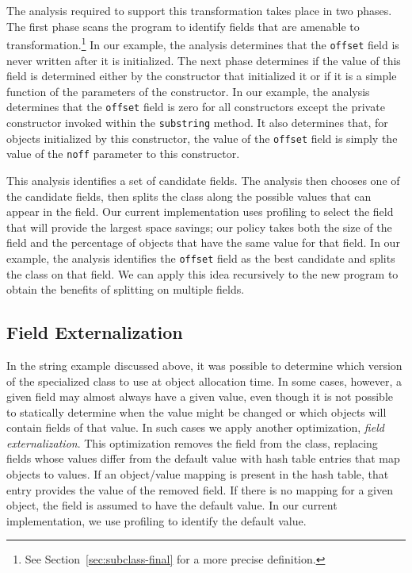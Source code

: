 \documentclass{acmconf}
\begin{document}
The analysis required to support this transformation takes place
in two phases. The first phase scans the program
to identify fields that
are amenable to transformation.\footnote{See
  Section~\ref{sec:subclass-final} for a more precise definition.}
In our example, the analysis
determines that the {\tt offset} field is never written after
it is initialized. The next phase determines if the value
of this field is determined either by the constructor that
initialized it or if it is a simple function of the parameters
of the constructor. In our example, the analysis determines
that the {\tt offset} field is zero for all constructors
except the private constructor invoked within the {\tt substring}
method. It also determines that, for objects initialized by 
this constructor, the value of the {\tt offset} field is simply
the value of the {\tt noff} parameter to this constructor. 

This analysis identifies a set of candidate fields. 
The analysis then chooses one of the candidate fields, then 
splits the class along the possible values
that can appear in the field. Our current implementation uses
profiling to select the field that will provide the largest
space savings; our policy takes both the size of the field
and the percentage of objects that have the same value for 
that field. In our example, the analysis identifies the 
{\tt offset} field as the best candidate and splits the class
on that field. We can apply this idea recursively to the 
new program to obtain the benefits of splitting on multiple
fields. 

\subsection{Field Externalization}

In the string example discussed above, it was possible to determine
which version of the specialized class to use at object allocation
time. In some cases, however, a given field may almost always have
a given value, even though it is not possible to statically determine
when the value might be changed or which objects will contain fields of that 
value. In such cases we apply another optimization, 
{\em field externalization}. This optimization removes the field
from the class, replacing fields whose values differ from the default 
value with hash table entries that map objects to values. If an object/value
mapping is present in the hash table, that entry provides the 
value of the removed field. If there is no mapping for a given object,
the field is assumed to have the default value. 
In our current implementation, we use profiling 
to identify the default value. 
\end{document}
